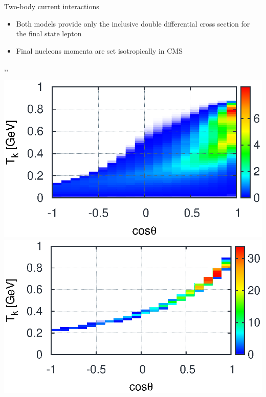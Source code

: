 \begin{wideslide}[toc=]{Two-body current interactions}
\null\vfill

  \begin{itemize}
    \item Both models provide only the inclusive double differential cross section for the final state lepton
    \item Final nucleons momenta are set isotropically in CMS
  \end{itemize}

  \sep\sep
  
  \twocolumn
  {
    \includegraphics[width=\columnwidth]{img/mec_lep_nieves.eps}
  }
  {
    \includegraphics[width=\columnwidth]{img/mec_lep_tem.eps}
  }


\vfill\null
\end{wideslide}


